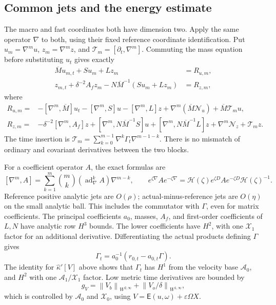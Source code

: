 \documentclass[11pt,a4paper]{article}
\numberwithin{equation}{section}
\theoremstyle{remark}
\newcommand{\norm}[1]{\left\lVert #1\right\rVert}
\newcommand{\Graph}{\mathsf E}
\newcommand{\Xzero}{\mathcal X_0}
\newcommand{\Xone}{\mathcal X_1}
\newcommand{\Azero}{\mathcal A_0}
\newcommand{\Aone}{\mathcal A_1}
\newcommand{\ad}{\operatorname{ad}}
\begin{document}
\subsection{Common jets and the energy estimate}

The macro and fast coordinates both have dimension two. Apply the
same operator \(\nabla\) to both, using their fixed reference coordinate
identification. Put \(u_m=\nabla^m u\), \(z_m=\nabla^m z\), and
\(\mathcal T_m=[\partial_t,\nabla^m]\). Commuting the mass equation
before substituting \(u_t\) gives exactly
\begin{equation}\label{eq:jet-system}
 \begin{aligned}
 \overline M u_{m,t}+Su_m+Lz_m&=R_{u,m},\\
 z_{m,t}+\delta^{-2}A_fz_m
       -N\overline M^{-1}(Su_m+Lz_m)&=R_{z,m},
 \end{aligned}
\end{equation}
where
\begin{equation}\label{eq:jet-remainders}
 \begin{aligned}
 R_{u,m}={}&-[\nabla^m,\overline M]u_t-[\nabla^m,S]u
       -[\nabla^m,L]z+\nabla^m(\overline M\mathcal N_u)
                              +\overline M\mathcal T_m u,\\
 R_{z,m}={}&-\delta^{-2}[\nabla^m,A_f]z
       +[\nabla^m,N\overline M^{-1}S]u
       +[\nabla^m,N\overline M^{-1}L]z
                              +\nabla^m\mathcal N_z+\mathcal T_m z .
 \end{aligned}
\end{equation}
The time insertion is
\(\mathcal T_m=\sum_{k=0}^{m-1}\nabla^k\Gamma_t\nabla^{m-1-k}\).
There is no mismatch of ordinary and covariant derivatives between
the two blocks.

For a coefficient operator \(A\), the exact formulas are
\[
 [\nabla^m,A]
    =\sum_{k=1}^m\binom mk(\ad_\nabla^k A)\nabla^{m-k},
 \qquad
 e^{\zeta\nabla}Ae^{-\zeta\nabla}
       =\mathcal H(\zeta)e^{\zeta D}Ae^{-\zeta D}\mathcal H(\zeta)^{-1}.
\]
Reference positive analytic jets are \(O(\rho)\); actual-minus-reference
jets are \(O(\eta)\) on the small analytic ball. This includes the
commutator with \(\Gamma\), even for matrix coefficients. The
principal coefficients \(a_0\), masses, \(A_f\), and first-order
coefficients of \(L,N\) have analytic row \(H^3\) bounds.
The lower coefficients have \(H^2\), with one \(\Xone\) factor
for an additional derivative.
Differentiating the actual products defining \(\Gamma\) gives
\[
 \Gamma_t=a_0^{-1}(r_{0,t}-a_{0,t}\Gamma).
\]
The identity for \(\widehat\kappa'[V]\) above shows that \(\Gamma_t\)
has \(H^1\) from the velocity base \(\Azero\), and \(H^2\) with one
\(\Aone/\Xone\) factor. Low metric time derivatives are bounded by
\[
 g_V=\norm{V_b}_{W^{2,\infty}}
                       +\norm{V_o/\delta}_{W^{1,\infty}},
\]
which is controlled by \(\Azero\) and \(\Xzero\), using
\(V=\Graph(u,\omega)+\varepsilon\Omega X\).
\end{document}
